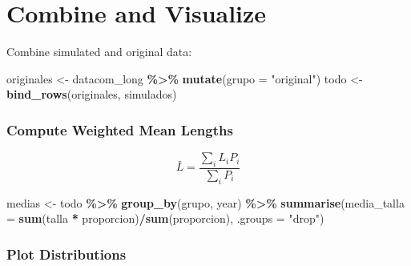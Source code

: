 \documentclass[
]{article}
\newenvironment{Shaded}{\begin{snugshade}}{\end{snugshade}}
\newcommand{\AttributeTok}[1]{\textcolor[rgb]{0.13,0.29,0.53}{#1}}
\newcommand{\FunctionTok}[1]{\textcolor[rgb]{0.13,0.29,0.53}{\textbf{#1}}}
\newcommand{\NormalTok}[1]{#1}
\newcommand{\OtherTok}[1]{\textcolor[rgb]{0.56,0.35,0.01}{#1}}
\newcommand{\SpecialCharTok}[1]{\textcolor[rgb]{0.81,0.36,0.00}{\textbf{#1}}}
\newcommand{\StringTok}[1]{\textcolor[rgb]{0.31,0.60,0.02}{#1}}
\begin{document}
\section{Combine and Visualize}\label{combine-and-visualize}

Combine simulated and original data:

\begin{Shaded}
\begin{Highlighting}[]
\NormalTok{originales }\OtherTok{\textless{}{-}}\NormalTok{ datacom\_long }\SpecialCharTok{\%\textgreater{}\%}
    \FunctionTok{mutate}\NormalTok{(}\AttributeTok{grupo =} \StringTok{"original"}\NormalTok{)}
\NormalTok{todo }\OtherTok{\textless{}{-}} \FunctionTok{bind\_rows}\NormalTok{(originales, simulados)}
\end{Highlighting}
\end{Shaded}

\subsubsection{Compute Weighted Mean Lengths}\label{compute-weighted-mean-lengths}

\[
\bar{L} = \frac{\sum_i L_i P_i}{\sum_i P_i}
\]

\begin{Shaded}
\begin{Highlighting}[]
\NormalTok{medias }\OtherTok{\textless{}{-}}\NormalTok{ todo }\SpecialCharTok{\%\textgreater{}\%}
    \FunctionTok{group\_by}\NormalTok{(grupo, year) }\SpecialCharTok{\%\textgreater{}\%}
    \FunctionTok{summarise}\NormalTok{(}\AttributeTok{media\_talla =} \FunctionTok{sum}\NormalTok{(talla }\SpecialCharTok{*}\NormalTok{ proporcion)}\SpecialCharTok{/}\FunctionTok{sum}\NormalTok{(proporcion),}
        \AttributeTok{.groups =} \StringTok{"drop"}\NormalTok{)}
\end{Highlighting}
\end{Shaded}

\subsubsection{Plot Distributions}\label{plot-distributions}
\end{document}
